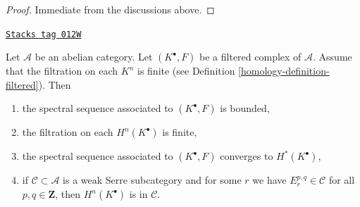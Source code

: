 \begin{proof}
Immediate from the discussions above.
\end{proof}

\begin{lemma}
\label{homology-lemma-biregular-ss-converges}
\href{https://stacks.math.columbia.edu/tag/012W}{\texttt{Stacks tag 012W}}

Let $\mathcal{A}$ be an abelian category. Let $(K^\bullet, F)$ be a
filtered complex of $\mathcal{A}$. Assume that the filtration on each $K^n$
is finite (see Definition \ref{homology-definition-filtered}). Then
\begin{enumerate}
\item the spectral sequence associated to $(K^\bullet, F)$ is bounded,
\item the filtration on each $H^n(K^\bullet)$ is finite,
\item the spectral sequence associated to $(K^\bullet, F)$ converges
to $H^*(K^\bullet)$,
\item if $\mathcal{C} \subset \mathcal{A}$ is a weak Serre subcategory
and for some $r$ we have $E_r^{p, q} \in \mathcal{C}$ for all
$p, q \in \mathbf{Z}$, then $H^n(K^\bullet)$ is in $\mathcal{C}$.
\end{enumerate}
\end{lemma}

